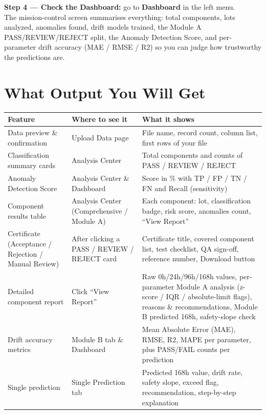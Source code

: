 \documentclass[11pt,a4paper]{article}
\begin{document}
\vspace{4pt}
\textbf{Step 4 --- Check the Dashboard:} go to \textbf{Dashboard} in the left menu.\\
The mission-control screen summarises everything: total components, lots analyzed, anomalies found,
drift models trained, the Module A PASS/REVIEW/REJECT split, the Anomaly Detection Score, and
per-parameter drift accuracy (MAE / RMSE / R2) so you can judge how trustworthy the predictions are.

\section{What Output You Will Get}
\begin{center}
\small
\begin{tabularx}{\textwidth}{@{}lXX@{}}
\toprule
\textbf{Feature} & \textbf{Where to see it} & \textbf{What it shows}\\
\midrule
Data preview \& confirmation & Upload Data page & File name, record count, column list, first rows of your file\\[2pt]
Classification summary cards & Analysis Center & Total components and counts of PASS / REVIEW / REJECT\\[2pt]
Anomaly Detection Score & Analysis Center \& Dashboard & Score in \% with TP / FP / TN / FN and Recall (sensitivity)\\[2pt]
Component results table & Analysis Center (Comprehensive / Module A) & Each component: lot, classification badge, risk score, anomalies count, ``View Report''\\[2pt]
Certificate (Acceptance / Rejection / Manual Review) & After clicking a PASS / REVIEW / REJECT card & Certificate title, covered component list, test checklist, QA sign-off, reference number, Download button\\[2pt]
Detailed component report & Click ``View Report'' & Raw 0h/24h/96h/168h values, per-parameter Module A analysis (z-score / IQR / absolute-limit flags), reasons \& recommendations, Module B predicted 168h, safety-slope check\\[2pt]
Drift accuracy metrics & Module B tab \& Dashboard & Mean Absolute Error (MAE), RMSE, R2, MAPE per parameter, plus PASS/FAIL counts per prediction\\[2pt]
Single prediction & Single Prediction tab & Predicted 168h value, drift rate, safety slope, exceed flag, recommendation, step-by-step explanation\\
\bottomrule
\end{tabularx}
\end{center}
\end{document}
